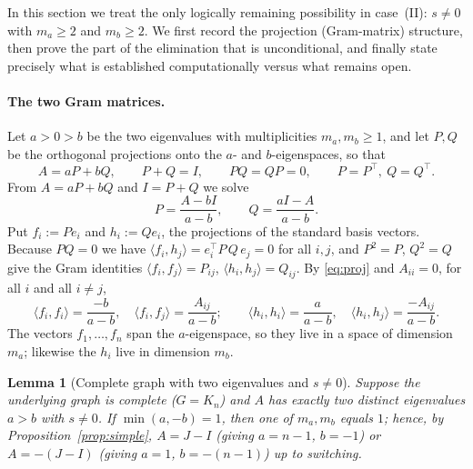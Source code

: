 \documentclass{amsart}
\newtheorem{lemma}{Lemma}
\theoremstyle{definition}
\begin{document}
In this section we treat the only logically remaining possibility in
case~(II): $s\ne0$ with $m_a\ge2$ and $m_b\ge2$. We first record the
projection (Gram-matrix) structure, then prove the part of the elimination
that is unconditional, and finally state precisely what is established
computationally versus what remains open.

\paragraph{The two Gram matrices.}
Let $a>0>b$ be the two eigenvalues with multiplicities $m_a,m_b\ge1$, and let
$P,Q$ be the orthogonal projections onto the $a$- and $b$-eigenspaces, so that
\[
A=aP+bQ,\qquad P+Q=I,\qquad PQ=QP=0,\qquad P=P^\top,\ Q=Q^\top .
\]
From $A=aP+bQ$ and $I=P+Q$ we solve
\begin{equation}\label{eq:proj}
P=\frac{A-bI}{a-b},\qquad Q=\frac{aI-A}{a-b}.
\end{equation}
Put $f_i:=Pe_i$ and $h_i:=Qe_i$, the projections of the standard basis vectors.
Because $PQ=0$ we have $\langle f_i,h_j\rangle=e_i^\top P\,Q\,e_j=0$ for all
$i,j$, and $P^2=P$, $Q^2=Q$ give the Gram identities
$\langle f_i,f_j\rangle=P_{ij}$, $\langle h_i,h_j\rangle=Q_{ij}$. By
\eqref{eq:proj} and $A_{ii}=0$, for all $i$ and all $i\ne j$,
\begin{equation}\label{eq:gram}
\langle f_i,f_i\rangle=\frac{-b}{a-b},\quad
\langle f_i,f_j\rangle=\frac{A_{ij}}{a-b};\qquad
\langle h_i,h_i\rangle=\frac{a}{a-b},\quad
\langle h_i,h_j\rangle=\frac{-A_{ij}}{a-b}.
\end{equation}
The vectors $f_1,\dots,f_n$ span the $a$-eigenspace, so they live in a space of
dimension $m_a$; likewise the $h_i$ live in dimension $m_b$.

\begin{lemma}[Complete graph with two eigenvalues and $s\ne0$]\label{lem:Kn}
Suppose the underlying graph is complete ($G=K_n$) and $A$ has exactly two
distinct eigenvalues $a>b$ with $s\ne0$. If $\min(a,-b)=1$, then one of
$m_a,m_b$ equals $1$; hence, by Proposition~\ref{prop:simple}, $A=J-I$ (giving
$a=n-1$, $b=-1$) or $A=-(J-I)$ (giving $a=1$, $b=-(n-1)$) up to switching.
\end{lemma}
\end{document}

